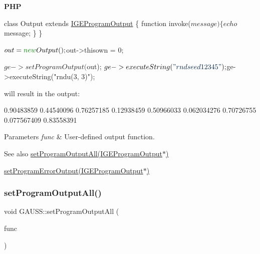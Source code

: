 {\bfseries P\+HP} 
\begin{DoxyCode}
\textcolor{keyword}{class }Output \textcolor{keyword}{extends} \hyperlink{class_i_g_e_program_output}{IGEProgramOutput} \{
    \textcolor{keyword}{function} invoke($message) \{
        echo $message;
    \}
\}

$out = \textcolor{keyword}{new} Output();
$out->thisown = 0;

$ge->setProgramOutput($out);
$ge->executeString(\textcolor{stringliteral}{"rndseed 12345"});
$ge->executeString(\textcolor{stringliteral}{"rndu(3, 3)"});
\end{DoxyCode}


will result in the output\+: 
\begin{DoxyCode}
0.90483859        0.44540096        0.76257185
0.12938459        0.50966033       0.062034276
0.70726755       0.077567409        0.83558391
\end{DoxyCode}



\begin{DoxyParams}{Parameters}
{\em func} & User-\/defined output function.\\
\hline
\end{DoxyParams}
\begin{DoxySeeAlso}{See also}
\hyperlink{class_g_a_u_s_s_a0b8379c48d677e05aeab433dba66fbb6}{set\+Program\+Output\+All(\+I\+G\+E\+Program\+Output$\ast$)} 

\hyperlink{class_g_a_u_s_s_abd75266b2c4075da75163fe95b013ef3}{set\+Program\+Error\+Output(\+I\+G\+E\+Program\+Output$\ast$)} 
\end{DoxySeeAlso}
\mbox{\label{class_g_a_u_s_s_a0b8379c48d677e05aeab433dba66fbb6}} 
\subsubsection{\texorpdfstring{set\+Program\+Output\+All()}{setProgramOutputAll()}}
{\footnotesize\ttfamily void G\+A\+U\+S\+S\+::set\+Program\+Output\+All (\begin{DoxyParamCaption}\item[{\hyperlink{class_i_g_e_program_output}{I\+G\+E\+Program\+Output} $\ast$}]{func }\end{DoxyParamCaption})\hspace{0.3cm}{\ttfamily [static]}}



